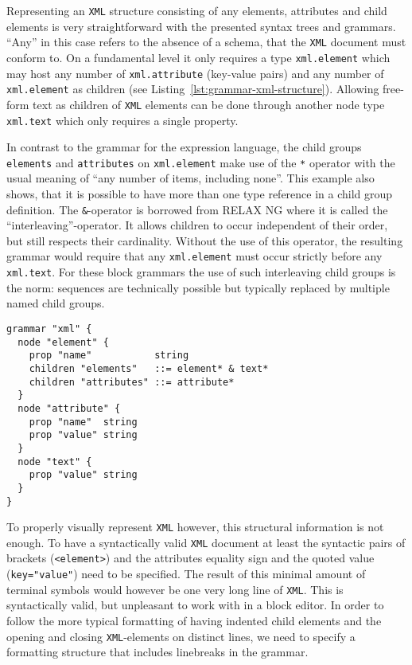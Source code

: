 \documentclass[sigconf,natbib=false]{acmart}
\newcommand{\enquote}[1]{``#1''}
\begin{document}
Representing an \texttt{XML} structure consisting of any elements, attributes and child elements is very straightforward with the presented syntax trees and grammars. \enquote{Any} in this case refers to the absence of a schema, that the \texttt{XML} document must conform to. On a fundamental level it only requires a type \texttt{xml.element} which may host any number of \texttt{xml.attribute} (key-value pairs) and any number of \texttt{xml.element} as children (see Listing~\ref{lst:grammar-xml-structure}). Allowing free-form text as children of \texttt{XML} elements can be done through another node type \texttt{xml.text} which only requires a single property.

In contrast to the grammar for the expression language, the child groups \texttt{elements} and \texttt{attributes} on \texttt{xml.element} make use of the \texttt{*} operator with the usual meaning of \enquote{any number of items, including none}. This example also shows, that it is possible to have more than one type reference in a child group definition. The \texttt{\&}-operator is borrowed from RELAX NG where it is called the \enquote{interleaving}-operator. It allows children to occur independent of their order, but still respects their cardinality. Without the use of this operator, the resulting grammar would require that any \texttt{xml.element} must occur strictly before any \texttt{xml.text}. For these block grammars the use of such interleaving child groups is the norm: sequences are technically possible but typically replaced by multiple named child groups.

\begin{lstlisting}[float, caption={Semantic structure of \texttt{XML}}, label=lst:grammar-xml-structure]
grammar "xml" {
  node "element" {
    prop "name"           string
    children "elements"   ::= element* & text*
    children "attributes" ::= attribute*
  }
  node "attribute" {
    prop "name"  string
    prop "value" string
  }
  node "text" {
    prop "value" string
  }
}
\end{lstlisting}

To properly visually represent \texttt{XML} however, this structural information is not enough. To have a syntactically valid \texttt{XML} document at least the syntactic pairs of brackets (\texttt{<element>}) and the attributes equality sign and the quoted value (\texttt{key="value"}) need to be specified. The result of this minimal amount of terminal symbols would however be one very long line of \texttt{XML}. This is syntactically valid, but unpleasant to work with in a block editor. In order to follow the more typical formatting of having indented child elements and the opening and closing \texttt{XML}-elements on distinct lines, we need to specify a formatting structure that includes linebreaks in the grammar.
\end{document}
